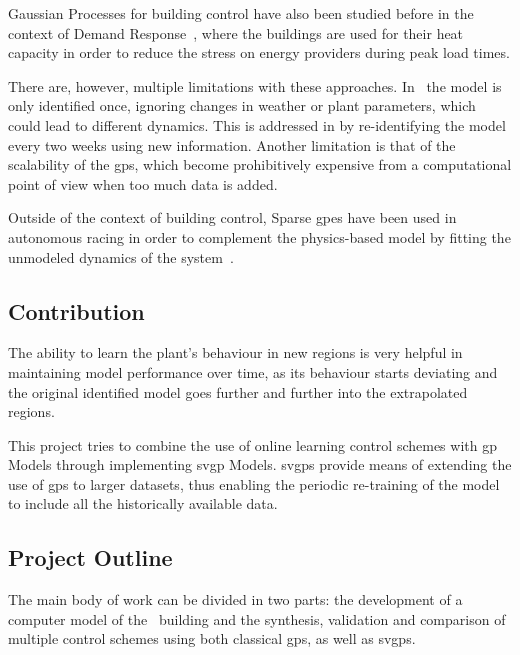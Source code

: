 Gaussian Processes for building control have also been studied before in the
context of Demand Response~\cite{nghiemDatadrivenDemandResponse2017,
jainLearningControlUsing2018}, where the buildings are used for their heat
capacity in order to reduce the stress on energy providers during peak load
times.

There are, however, multiple limitations with these approaches. 
In~\cite{nghiemDatadrivenDemandResponse2017} the model is only identified once,
ignoring changes in weather or plant parameters, which could lead to different
dynamics. This is addressed in \cite{jainLearningControlUsing2018} by
re-identifying the model every two weeks using new information. Another
limitation is that of the scalability of the \acrshort{gp}s, which become
prohibitively expensive from a computational point of view when too much data is
added.

Outside of the context of building control, Sparse \acrlong{gp}es have been used
in autonomous racing in order to complement the physics-based model by fitting
the unmodeled dynamics of the
system~\cite{kabzanLearningBasedModelPredictive2019}.

\subsection{Contribution}

The ability to learn the plant's behaviour in new regions is very helpful in
maintaining model performance over time, as its behaviour starts deviating and
the original identified model goes further and further into the extrapolated
regions.

This project tries to combine the use of online learning control schemes with
\acrshort{gp} Models through implementing \acrfull{svgp} Models. \acrshort{svgp}s
provide means of extending the use of \acrshort{gp}s to larger datasets, thus
enabling the periodic re-training of the model to include all the historically
available data.

\subsection{Project Outline}

The main body of work can be divided in two parts: the development of a computer
model of the \pdome\ building and the synthesis, validation and comparison of
multiple control schemes using both classical \acrshort{gp}s, as well as
\acrshort{svgp}s.

